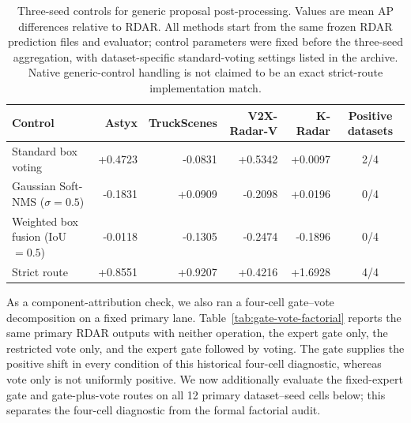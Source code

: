 \documentclass[preprint,12pt,times]{elsarticle}
\newcommand{\reviewcaption}[1]{\caption{\textcolor{floatreviewblue}{#1}}}
\newcommand{\reviewcaption}[1]{\caption{#1}}
\begin{document}
\begin{table}[!t]
\centering
\reviewcaption{Three-seed controls for generic proposal post-processing. Values
are mean AP differences relative to RDAR. All methods start from the same
frozen RDAR prediction files and evaluator; control parameters were fixed
before the three-seed aggregation, with dataset-specific standard-voting
settings listed in the archive. Native generic-control handling is not claimed
to be an exact strict-route implementation match.}
\label{tab:postprocessing-controls}
\begingroup
\color{black}
\scriptsize
\setlength{\tabcolsep}{5pt}
\renewcommand{\arraystretch}{1.12}
\begin{tabular}{lrrrrc}
\toprule
Control & Astyx & TruckScenes & V2X-Radar-V & K-Radar & Positive datasets \\
\midrule
Standard box voting & +0.4723 & -0.0831 & +0.5342 & +0.0097 & 2/4 \\
Gaussian Soft-NMS ($\sigma=0.5$) & -0.1831 & +0.0909 & -0.2098 & +0.0196 & 0/4 \\
Weighted box fusion (IoU $=0.5$) & -0.0118 & -0.1305 & -0.2474 & -0.1896 & 0/4 \\
Strict route & +0.8551 & +0.9207 & +0.4216 & +1.6928 & 4/4 \\
\bottomrule
\end{tabular}
\endgroup
\end{table}

As a component-attribution check, we also ran a four-cell gate--vote
decomposition on a fixed primary lane. Table~\ref{tab:gate-vote-factorial}
reports the same primary RDAR outputs with neither operation, the expert gate
only, the restricted vote only, and the expert gate followed by voting. The
gate supplies the positive shift in every condition of this historical
four-cell diagnostic, whereas vote only is not uniformly positive. We now
additionally evaluate the fixed-expert gate and gate-plus-vote routes on all
12 primary dataset--seed cells below; this separates the four-cell diagnostic
from the formal factorial audit.
\end{document}
